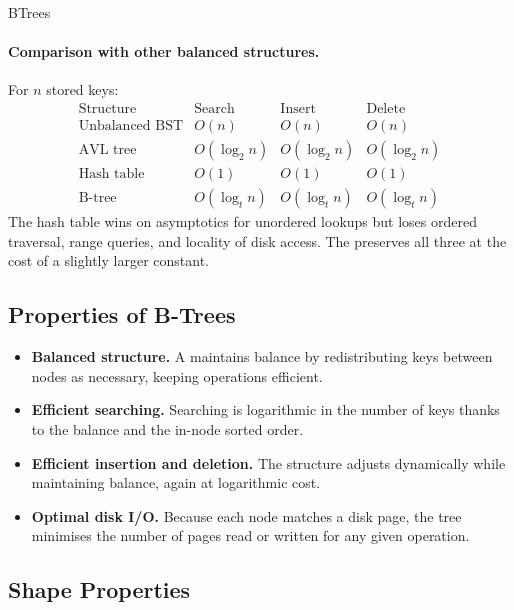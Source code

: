 \documentclass[hidelinks]{article}
\begin{document}
\begin{smodule}[title={B-Trees}]{BTrees}
\paragraph{Comparison with other balanced structures.}
For $n$ stored keys:
\[
\begin{array}{l|lll}
\text{Structure} & \text{Search} & \text{Insert} & \text{Delete}\\
\hline
\text{Unbalanced BST} & O(n) & O(n) & O(n)\\
\text{AVL tree} & O(\log_2 n) & O(\log_2 n) & O(\log_2 n)\\
\text{Hash table} & O(1) & O(1) & O(1)\\
\text{B-tree} & O(\log_t n) & O(\log_t n) & O(\log_t n)
\end{array}
\]
The hash table wins on asymptotics for unordered lookups but loses ordered traversal, range queries, and locality of disk access. The  preserves all three at the cost of a slightly larger constant.

\subsection{Properties of B-Trees}

\begin{itemize}
  \item \textbf{Balanced structure.} A  maintains balance by redistributing keys between nodes as necessary, keeping operations efficient.
  \item \textbf{Efficient searching.} Searching is logarithmic in the number of keys thanks to the balance and the in-node sorted order.
  \item \textbf{Efficient insertion and deletion.} The structure adjusts dynamically while maintaining balance, again at logarithmic cost.
  \item \textbf{Optimal disk I/O.} Because each node matches a disk page, the tree minimises the number of pages read or written for any given operation.
\end{itemize}

\subsection{Shape Properties}


\end{smodule}
\end{document}
